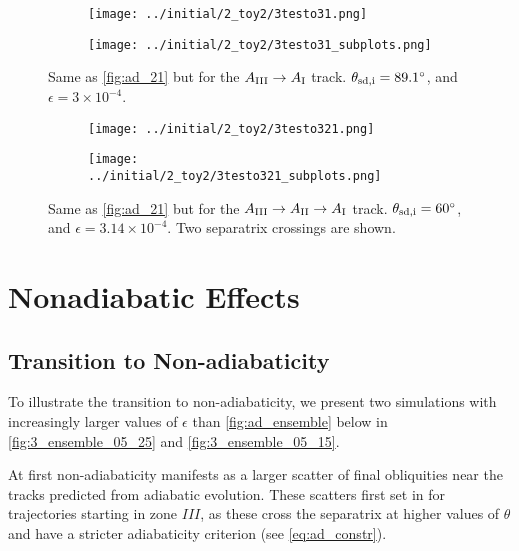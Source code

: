 \documentclass[
        fleqn,
        usenatbib,
        referee,
    ]{mnras}
\begin{document}
\begin{figure}
    \centering
    \begin{subfigure}{\columnwidth}
        \centering
        \texttt{[image: ../initial/2\_toy2/3testo31.png]}
    \end{subfigure}
    \begin{subfigure}{\columnwidth}
        \centering
        \texttt{[image: ../initial/2\_toy2/3testo31\_subplots.png]}
    \end{subfigure}
    \caption{Same as \autoref{fig:ad_21} but for the $A_{\rm III} \to A_{\rm I}$
    track. $\theta_{\rm sd, i} = 89.1^\circ$, and $\epsilon = 3 \times
    10^{-4}$.}\label{fig:ad_31}
\end{figure}
\begin{figure}
    \centering
    \begin{subfigure}{\columnwidth}
        \centering
        \texttt{[image: ../initial/2\_toy2/3testo321.png]}
    \end{subfigure}
    \begin{subfigure}{\columnwidth}
        \centering
        \texttt{[image: ../initial/2\_toy2/3testo321\_subplots.png]}
    \end{subfigure}
    \caption{Same as \autoref{fig:ad_21} but for the $A_{\rm III} \to A_{\rm II}
    \to A_{\rm I}$ track. $\theta_{\rm sd, i} = 60^\circ$, and $\epsilon = 3.14
    \times 10^{-4}$. Two separatrix crossings are shown.}\label{fig:ad_321}
\end{figure}

\section{Nonadiabatic Effects}\label{s:nonad}

\subsection{Transition to Non-adiabaticity}\label{ss:transition}

To illustrate the transition to non-adiabaticity, we present two simulations
with increasingly larger values of $\epsilon$ than \autoref{fig:ad_ensemble}
below in \autoref{fig:3_ensemble_05_25} and \autoref{fig:3_ensemble_05_15}.

At first non-adiabaticity manifests as a larger scatter of final obliquities
near the tracks predicted from adiabatic evolution. These scatters first set in
for trajectories starting in zone $III$, as these cross the separatrix at higher
values of $\theta$ and have a stricter adiabaticity criterion (see
\autoref{eq:ad_constr}).
\end{document}
